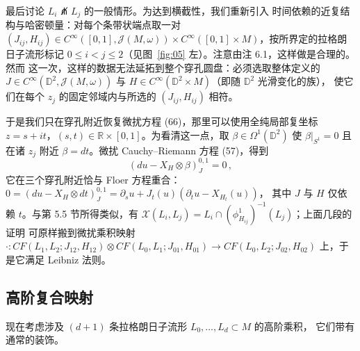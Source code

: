 最后讨论 $L_i\not\pitchfork L_j$ 的一般情形。为达到横截性，我们重新引入
时间依赖的近复结构与哈密顿量：对每个条带状端点取一对
$(J_{ij},H_{ij})\in C^\infty([0,1],\mathcal J(M,\omega))\times
C^\infty([0,1]\times M)$，按所界定的拉格朗日子流形标记
$0\le i<j\le 2$（见图~\ref{fig:05} 左）。注意由注 6.1，这样做是合理的。然而
这一次，这样的数据无法延拓到整个穿孔圆盘：必须选取整体定义的
$J\in C^\infty(\mathbb D^2,\mathcal J(M,\omega))$ 与
$H\in C^\infty(\mathbb D^2\times M)$（即随 $\mathbb D^2$ 光滑变化的族），
使它们在每个 $z_j$ 的固定邻域内与所选的 $(J_{ij},H_{ij})$ 相符。

于是我们只在穿孔附近恢复微扰方程 (66)，那里可以使用全纯局部复坐标
$z=s+it$，$(s,t)\in\mathbb R\times[0,1]$。为看清这一点，取
$\beta\in\Omega^1(\mathbb D^2)$ 使 $\beta|_{S^1}=0$ 且在诸 $z_j$ 附近
$\beta=dt$。微扰 Cauchy--Riemann 方程 (57)，得到
\begin{equation}
(du-X_H\otimes\beta)^{0,1}_J=0\,,
\label{eq:6.81}
\end{equation}
它在三个穿孔附近恰与 Floer 方程重合：
$0=(du-X_H\otimes dt)^{0,1}_J=\partial_s u+J_t(u)(\partial_t u-X_{H_t}(u))$，
其中 $J$ 与 $H$ 仅依赖 $t$。与第 5.5 节所得类似，有
$\mathcal X(L_i,L_j)=L_i\cap(\phi^1_{H_{ij}})^{-1}(L_j)$；上面几段的证明
可原样搬到微扰乘积映射
$\cdot:CF(L_1,L_2;J_{12},H_{12})\otimes CF(L_0,L_1;J_{01},H_{01})
\to CF(L_0,L_2;J_{02},H_{02})$ 上，于是它满足 Leibniz 法则。


\subsection{高阶复合映射}\label{sec:6.2}

现在考虑涉及 $(d+1)$ 条拉格朗日子流形 $L_0,\dots,L_d\subset M$ 的高阶乘积，
它们带有通常的装饰。

